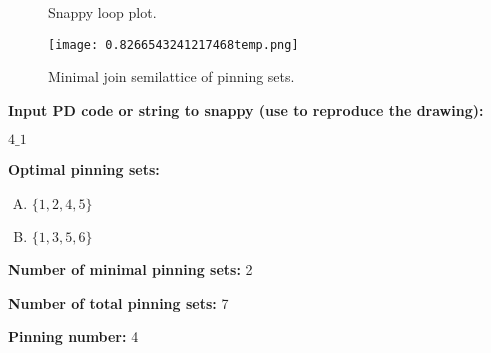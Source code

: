 \documentclass{article}%
\begin{document}
\begin{multicols}{2}
\begin{figure}[H]
\centering

\caption{Snappy loop plot.}
\label{fig:0.7520558646872636temp.svg}
\end{figure}\columnbreak

\begin{figure}[H]
\centering
\texttt{[image: 0.8266543241217468temp.png]}
\caption{Minimal join semilattice of pinning sets.}
\label{fig:0.8266543241217468temp.png}
\end{figure}\end{multicols}\newpage\begin{multicols}{2}

\columnbreak

\noindent\textbf{Input PD code or string to snappy (use to reproduce the drawing):}

	$4\_1$

\noindent\textbf{Optimal pinning sets:}

\begin{enumerate}[A)]
\item{\Huge\textcolor{red0}{\textbullet}}$\{1,2,4,5\}$

\item{\Huge\textcolor{red5}{\textbullet}}$\{1,3,5,6\}$

\end{enumerate}


\noindent\textbf{Number of minimal pinning sets:} 2

\noindent\textbf{Number of total pinning sets:} 7

\noindent\textbf{Pinning number:} 4


\end{multicols}
\end{document}
